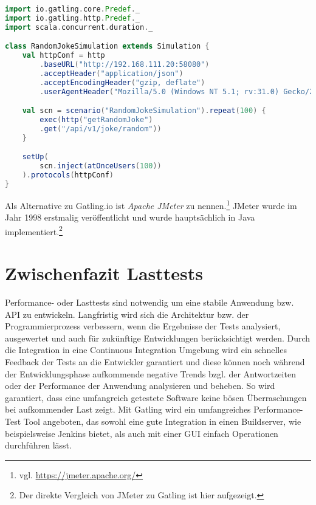 \begin{minipage}{\linewidth}
\begin{lstlisting}[frame=single,caption=Testabfrage auf Schnittstelle in Gatling, label=testCodingSample, language=Scala]
import io.gatling.core.Predef._
import io.gatling.http.Predef._
import scala.concurrent.duration._

class RandomJokeSimulation extends Simulation {
    val httpConf = http
        .baseURL("http://192.168.111.20:58080")
        .acceptHeader("application/json")
        .acceptEncodingHeader("gzip, deflate")
        .userAgentHeader("Mozilla/5.0 (Windows NT 5.1; rv:31.0) Gecko/20100101 Firefox/31.0")

    val scn = scenario("RandomJokeSimulation").repeat(100) {
        exec(http("getRandomJoke")
        .get("/api/v1/joke/random"))
    }    

    setUp(
        scn.inject(atOnceUsers(100))
    ).protocols(httpConf)
}
\end{lstlisting}
\end{minipage}
Als Alternative zu Gatling.io ist \textit{Apache JMeter} zu nennen.\footnote{{} vgl. \url{https://jmeter.apache.org/}}
JMeter wurde im Jahr 1998 erstmalig veröffentlicht und wurde hauptsächlich in Java implementiert.\footnote{{} Der direkte Vergleich von JMeter zu Gatling ist hier aufgezeigt.\cite{JMetervs63:online}}

\section{Zwischenfazit Lasttests}

Performance- oder Lasttests sind notwendig um eine stabile Anwendung bzw. API zu entwickeln.
Langfristig wird sich die Architektur bzw. der Programmierprozess verbessern, wenn die Ergebnisse der Tests analysiert, ausgewertet und auch für zukünftige Entwicklungen berücksichtigt werden.
Durch die Integration in eine Continuous Integration Umgebung wird ein schnelles Feedback der Tests an die Entwickler garantiert und diese können noch während der Entwicklungsphase aufkommende negative Trends bzgl. der Antwortzeiten oder der Performance der Anwendung analysieren und beheben.
So wird garantiert, dass eine umfangreich getestete Software keine bösen Überraschungen bei aufkommender Last zeigt.
Mit Gatling wird ein umfangreiches Performance-Test Tool angeboten, das sowohl eine gute Integration in einen Buildserver, wie beispielsweise Jenkins bietet, als auch mit einer \ac{GUI} einfach Operationen durchführen lässt.


